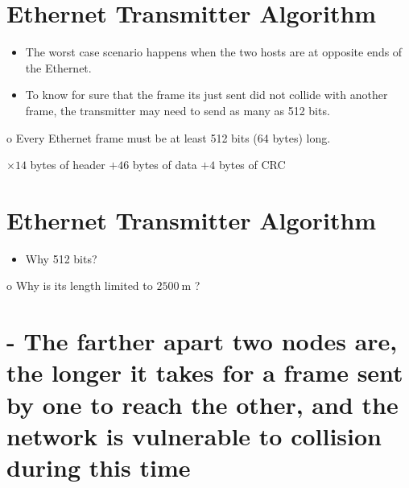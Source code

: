 \documentclass[10pt]{article}
\begin{document}
\section{Ethernet Transmitter Algorithm}
\begin{itemize}
  \item The worst case scenario happens when the two hosts are at opposite ends of the Ethernet.

  \item To know for sure that the frame its just sent did not collide with another frame, the transmitter may need to send as many as 512 bits.

\end{itemize}

o Every Ethernet frame must be at least 512 bits (64 bytes) long.

$\times 14$ bytes of header $+46$ bytes of data $+4$ bytes of CRC

\section{Ethernet Transmitter Algorithm}
\begin{itemize}
  \item Why 512 bits?
\end{itemize}

o Why is its length limited to $2500 \mathrm{~m}$ ?

\section{- The farther apart two nodes are, the longer it takes for a frame sent by one to reach the other, and the network is vulnerable to collision during this time}
\end{document}

